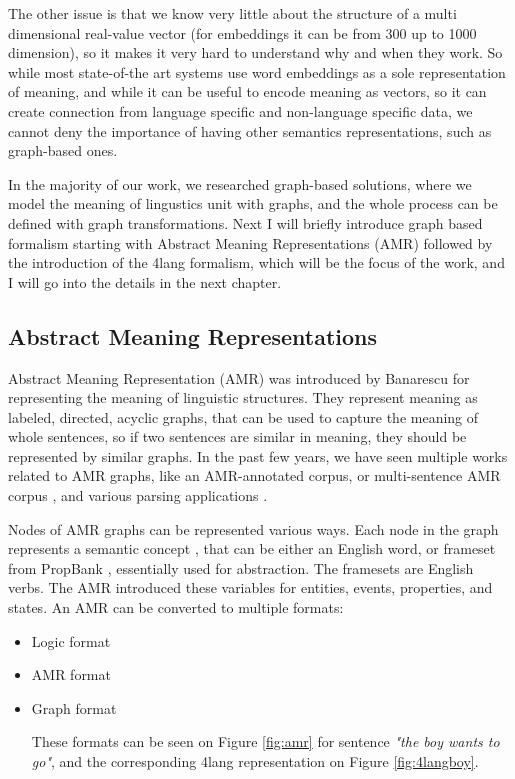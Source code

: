  The other issue is that we know very little about the structure of a multi dimensional real-value vector (for embeddings it can be from 300 up to 1000 dimension), so it makes it very hard to understand why and when they work. So while most state-of-the art systems use word embeddings as a sole representation of meaning, and while it can be useful to encode meaning as vectors, so it can create connection from language specific and non-language specific data, we cannot deny the importance of having other semantics representations, such as graph-based ones. 
 
 In the majority of our work, we researched graph-based solutions, where we model the meaning of lingustics unit with graphs, and the whole process can be defined with graph transformations. Next I will briefly introduce graph based formalism starting with Abstract Meaning Representations (AMR) followed by the introduction of the 4lang formalism, which will be the focus of the work, and I will go into the details in the next chapter.
 
 \subsection{Abstract Meaning Representations}
 Abstract Meaning Representation (AMR) was introduced by Banarescu\cite{Banarescu:2013} for representing the meaning of linguistic structures. They represent meaning as labeled, directed, acyclic graphs, that can be used to capture the meaning of whole sentences, so if two sentences are similar in meaning, they should be represented by similar graphs. In the past few years, we have seen multiple works related to AMR graphs, like an AMR-annotated corpus\cite{Banarescu:2013}, or multi-sentence AMR corpus \cite{OGorman2018AMRBT}, and various parsing applications \cite{DAC:2017} \cite{Vanderwende:2015}.
 
 Nodes of AMR graphs can be represented various ways. Each node in the graph represents a semantic concept \cite{AMR:2015}, that can be either an English word, or frameset from PropBank \cite{Palmer:2005}, essentially used for abstraction. The framesets are English verbs. The AMR introduced these variables for entities, events, properties, and states. An AMR can be converted to multiple formats:
 \begin{itemize}
 	\item Logic format
 	\item AMR format
 	\item Graph format
 	
 These formats can be seen on Figure \ref{fig:amr} for sentence \textit{"the boy wants to go"}, and the corresponding 4lang representation on Figure \ref{fig:4langboy}.
 
 \end{itemize}
 
